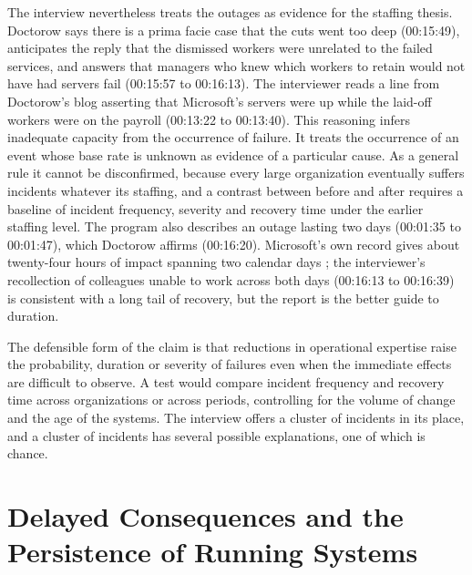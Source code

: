 \documentclass[12pt]{article}
\newcommand{\ts}[1]{(#1)}
\begin{document}
The interview nevertheless treats the outages as evidence for the staffing thesis. Doctorow says there is a prima facie case that the cuts went too deep \ts{00:15:49}, anticipates the reply that the dismissed workers were unrelated to the failed services, and answers that managers who knew which workers to retain would not have had servers fail \ts{00:15:57 to 00:16:13}. The interviewer reads a line from Doctorow's blog asserting that Microsoft's servers were up while the laid-off workers were on the payroll \ts{00:13:22 to 00:13:40}. This reasoning infers inadequate capacity from the occurrence of failure. It treats the occurrence of an event whose base rate is unknown as evidence of a particular cause. As a general rule it cannot be disconfirmed, because every large organization eventually suffers incidents whatever its staffing, and a contrast between before and after requires a baseline of incident frequency, severity and recovery time under the earlier staffing level. The program also describes an outage lasting two days \ts{00:01:35 to 00:01:47}, which Doctorow affirms \ts{00:16:20}. Microsoft's own record gives about twenty-four hours of impact spanning two calendar days \cite{msreport}; the interviewer's recollection of colleagues unable to work across both days \ts{00:16:13 to 00:16:39} is consistent with a long tail of recovery, but the report is the better guide to duration.

The defensible form of the claim is that reductions in operational expertise raise the probability, duration or severity of failures even when the immediate effects are difficult to observe. A test would compare incident frequency and recovery time across organizations or across periods, controlling for the volume of change and the age of the systems. The interview offers a cluster of incidents in its place, and a cluster of incidents has several possible explanations, one of which is chance.

\section{Delayed Consequences and the Persistence of Running Systems}
\end{document}
